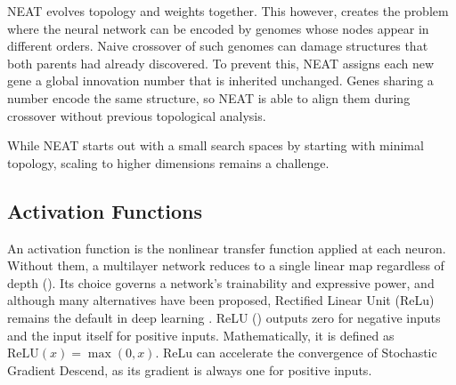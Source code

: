 \documentclass[12pt]{article}
\begin{document}
NEAT evolves topology and weights together. This however, creates the problem where the neural network can be encoded by genomes whose nodes appear in different orders. Naive crossover of such genomes can damage structures that both parents had already discovered. To prevent this, NEAT assigns each new gene a global innovation number that is inherited unchanged. Genes sharing a number encode the same structure, so NEAT is able to align them during crossover without previous topological analysis.

While NEAT starts out with a small search spaces by starting with minimal topology, scaling to higher dimensions remains a challenge. 


\subsection{Activation Functions}



An activation function is the nonlinear transfer function applied at each neuron. Without them, a multilayer network reduces to a single linear map regardless of depth (\cite{dubey_activation_2022}). Its choice governs a network's trainability and expressive power, and although many alternatives have been proposed, Rectified Linear Unit (ReLu) remains the default in deep learning \cite{ramachandran_searching_2017}. ReLU (\cite{nair_rectified_2010}) outputs zero for negative inputs and the input itself for positive inputs. Mathematically, it is defined as $\mathrm{ReLU}(x)=\max(0,x)$. ReLu can accelerate the convergence of Stochastic Gradient Descend, as its gradient is always one for positive inputs. 
\end{document}
